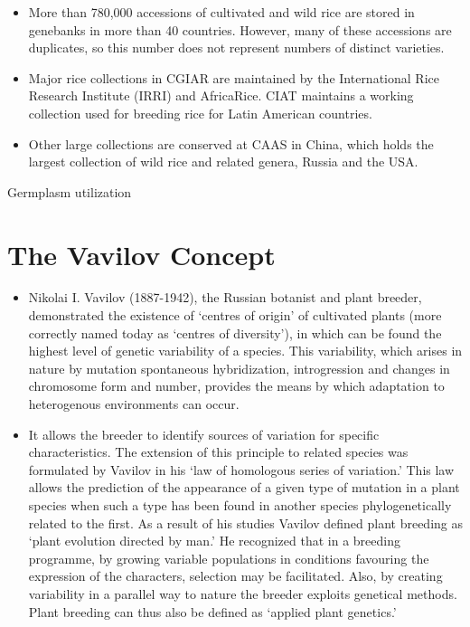 \documentclass[11pt,ignorenonframetext,aspectratio=169]{beamer}
\providecommand{\tightlist}{%
  \setlength{\itemsep}{0pt}\setlength{\parskip}{0pt}}
\begin{document}
\begin{frame}{}
\protect\hypertarget{section-9}{}
\begin{itemize}
\tightlist
\item
  More than 780,000 accessions of cultivated and wild rice are stored in
  genebanks in more than 40 countries. However, many of these accessions
  are duplicates, so this number does not represent numbers of distinct
  varieties.
\item
  Major rice collections in CGIAR are maintained by the International
  Rice Research Institute (IRRI) and AfricaRice. CIAT maintains a
  working collection used for breeding rice for Latin American
  countries.
\item
  Other large collections are conserved at CAAS in China, which holds
  the largest collection of wild rice and related genera, Russia and the
  USA.
\end{itemize}
\end{frame}

\begin{frame}{Germplasm utilization}
\protect\hypertarget{germplasm-utilization}{}
\end{frame}

\hypertarget{the-vavilov-concept}{%
\section{The Vavilov Concept}\label{the-vavilov-concept}}

\begin{frame}{}
\protect\hypertarget{section-10}{}
\begin{itemize}
\item
  Nikolai I. Vavilov (1887-1942), the Russian botanist and plant
  breeder, demonstrated the existence of `centres of origin' of
  cultivated plants (more correctly named today as `centres of
  diversity'), in which can be found the highest level of genetic
  variability of a species. This variability, which arises in nature by
  mutation spontaneous hybridization, introgression and changes in
  chromosome form and number, provides the means by which adaptation to
  heterogenous environments can occur.
\item
  It allows the breeder to identify sources of variation for specific
  characteristics. The extension of this principle to related species
  was formulated by Vavilov in his `law of homologous series of
  variation.' This law allows the prediction of the appearance of a
  given type of mutation in a plant species when such a type has been
  found in another species phylogenetically related to the first. As a
  result of his studies Vavilov defined plant breeding as `plant
  evolution directed by man.' He recognized that in a breeding
  programme, by growing variable populations in conditions favouring the
  expression of the characters, selection may be facilitated. Also, by
  creating variability in a parallel way to nature the breeder exploits
  genetical methods. Plant breeding can thus also be defined as `applied
  plant genetics.'
\end{itemize}
\end{frame}
\end{document}
